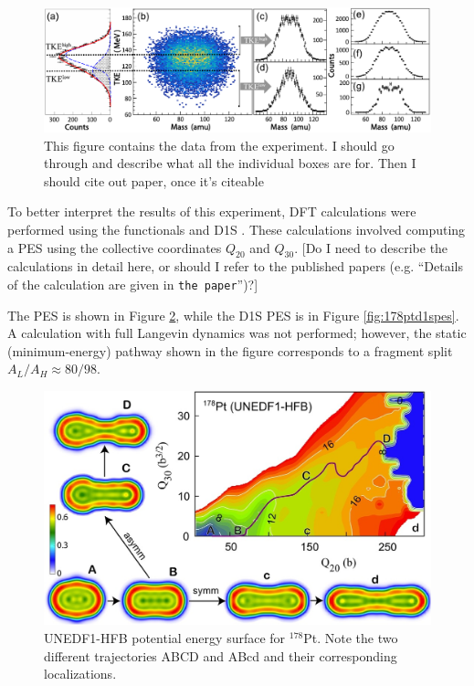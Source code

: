 \begin{figure}
	\centering
	\includegraphics[width=0.95\linewidth]{TeX_files/178Pt_expt_data}
	\caption[$^{178}$Pt experimental data]{This figure contains the data from the {\Pt} experiment. I should go through and describe what all the individual boxes are for. Then I should cite out paper, once it's citeable}
	\label{fig:178ptexptdata}
\end{figure}

To better interpret the results of this experiment, DFT calculations were performed using the functionals {\hfb} \cite{Schunck2015} and D1S \cite{Berger1989}. These calculations involved computing a PES using the collective coordinates $Q_{20}$ and $Q_{30}$. [Do I need to describe the calculations in detail here, or should I refer to the published papers (e.g. ``Details of the calculation are given in \verb|the paper|'')?]

The {\hfb} PES is shown in Figure \ref{fig:178ptunedf1pes}, while the D1S PES is in Figure \ref{fig:178ptd1spes}. A calculation with full Langevin dynamics was not performed; however, the static (minimum-energy) pathway shown in the figure corresponds to a fragment split $A_L/A_H \approx 80/98$.

\begin{figure}
	\centering
	\includegraphics[width=0.7\linewidth]{TeX_files/178Pt_unedf1_pes.jpg}
	\caption[UNEDF1-HFB potential energy surface for $^{178}$Pt]{UNEDF1-HFB potential energy surface for $^{178}$Pt. Note the two different trajectories ABCD and ABcd and their corresponding localizations.}
	\label{fig:178ptunedf1pes}
\end{figure}

